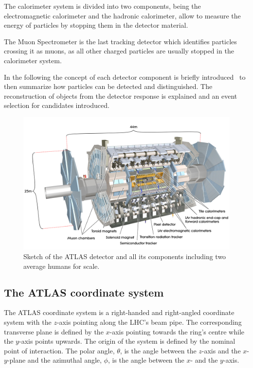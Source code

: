 The calorimeter system is divided into two components, being the electromagnetic calorimeter and the hadronic calorimeter, allow to measure the energy of particles by stopping them in the detector material.

The Muon Spectrometer is the last tracking detector which identifies particles crossing it as muons, as all other charged particles are usually stopped in the calorimeter system.

In the following the concept of each detector component is briefly introduced~\cite{wermes} to then summarize how particles can be detected and distinguished. The reconstruction of objects from the detector response is explained and an event selection for \tW candidates introduced.



\begin{figure}[htbp]
  \centering
  \includegraphics[scale=0.15]{figures_LHC/atlas-detector}
  \caption[Sketch of the ATLAS detector]{Sketch of the ATLAS detector and all its components including two average humans for scale.~\cite{Pequenao:1095924}}
  \label{fig:atlas}
\end{figure}

\subsection{The ATLAS coordinate system}

The ATLAS coordinate system is a right-handed and right-angled coordinate system with the $z$-axis pointing along the LHC's beam pipe. The corresponding transverse plane is defined by the $x$-axis pointing towards the ring's centre while the $y$-axis points upwards. The origin of the system is defined by the nominal point of interaction. The polar angle, $\theta$, is the angle between the $z$-axis and the $x$-$y$-plane and the azimuthal angle, $\phi$, is the angle between the $x$- and the $y$-axis.


